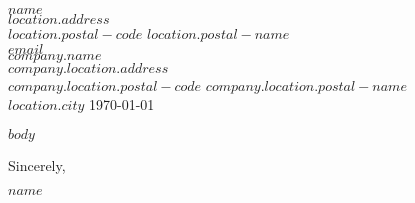 \documentclass[]{$documentclass$}
\def\sign{Med vennlig hilsen}
\def\sign{Sincerely}
\begin{document}
{\selectfont\thispagestyle{empty}
    $name$\\
    $location.address$\\
    $location.postal-code$ $location.postal-name$\\
    $email$\\

    $company.name$\\
    $company.location.address$\\
    $company.location.postal-code$ $company.location.postal-name$\\

    \hfill $location.city$ \today

    $body$

    \sign,
    
    $name$

}
\end{document}
